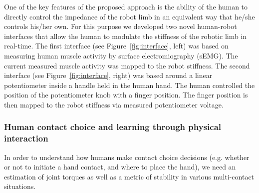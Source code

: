 \documentclass[final,5p,twocolumn]{elsarticle}
\begin{document}
One of the key features of the proposed approach is the ability of the human to directly control the impedance of the robot limb in an equivalent way that he/she controls his/her own. For this purpose we developed two novel human-robot interfaces \cite{Peternel2014,Peternel2015} that allow the human to modulate the stiffness of the robotic limb in real-time. The first interface (see Figure~\ref{fig:interface}, left) was based on measuring human muscle activity by surface electromiography (sEMG). The current measured muscle activity was mapped to the robot stiffness. The second interface (see Figure~\ref{fig:interface}, right) was based around a linear potentiometer inside a handle held in the human hand. The human controlled the position of the potentiometer knob with a finger position. The finger position is then mapped to the robot stiffness via measured potentiometer voltage.




\subsubsection{Human contact choice and learning through physical interaction}
In order to understand how humans make contact choice decisions (e.g. whether or not to initiate a hand contact, and where to place the hand), we need an estimation of joint torques as well as a metric of stability in various multi-contact situations.

\end{document}
